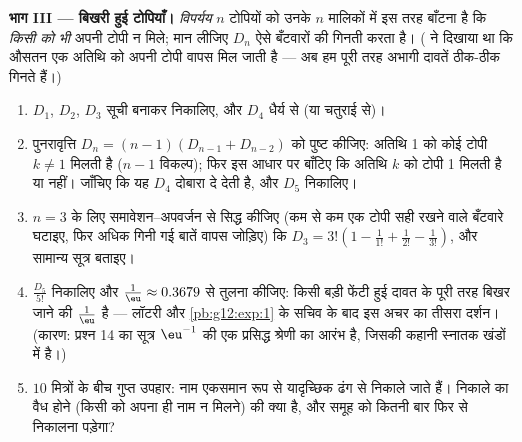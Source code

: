 \begin{problem}
\medskip
\noindent\textbf{भाग III --- बिखरी हुई टोपियाँ।}
\emph{विपर्यय} $n$ टोपियों को उनके $n$ मालिकों में इस तरह बाँटना है कि
\emph{किसी को भी} अपनी टोपी न मिले; मान लीजिए $D_n$ ऐसे बँटवारों की गिनती
करता है। ( ने दिखाया था कि औसतन एक अतिथि को अपनी टोपी वापस मिल जाती है
--- अब हम पूरी तरह अभागी दावतें ठीक-ठीक गिनते हैं।)
\begin{enumerate}[resume]
  \item $D_1$, $D_2$, $D_3$ सूची बनाकर निकालिए, और $D_4$ धैर्य से (या
        चतुराई से)।
  \item पुनरावृत्ति $D_n = (n - 1)\left(D_{n-1} + D_{n-2}\right)$ को पुष्ट कीजिए: अतिथि 1 को कोई टोपी $k \neq 1$ मिलती है
        ($n - 1$ विकल्प); फिर इस आधार पर बाँटिए कि अतिथि $k$ को टोपी 1 मिलती
        है या नहीं। जाँचिए कि यह $D_4$ दोबारा दे देती है, और $D_5$ निकालिए।
  \item $n = 3$ के लिए समावेशन--अपवर्जन से सिद्ध कीजिए (कम से कम एक टोपी सही
        रखने वाले बँटवारे घटाइए, फिर अधिक गिनी गई बातें वापस जोड़िए) कि
        $D_3 = 3!\left(1 - \frac{1}{1!} + \frac{1}{2!} -
        \frac{1}{3!}\right)$, और सामान्य सूत्र बताइए।
  \item $\frac{D_5}{5!}$ निकालिए और $\frac1\eu \approx 0.3679$ से तुलना कीजिए: किसी बड़ी फेंटी हुई दावत के
        पूरी तरह बिखर जाने की  $\frac1\eu$ है --- लॉटरी और \cref{pb:g12:exp:1} के
        सचिव के बाद इस अचर का तीसरा दर्शन। (कारण: प्रश्न 14 का सूत्र $\eu^{-1}$
        की एक प्रसिद्ध श्रेणी का आरंभ है, जिसकी कहानी स्नातक खंडों में है।)
  \item $10$ मित्रों के बीच गुप्त उपहार: नाम एकसमान रूप से यादृच्छिक ढंग
        से निकाले जाते हैं। निकाले का वैध होने (किसी को अपना ही नाम न मिलने)
        की  क्या है, और समूह को कितनी बार फिर से निकालना पड़ेगा?
\end{enumerate}


\end{problem}
